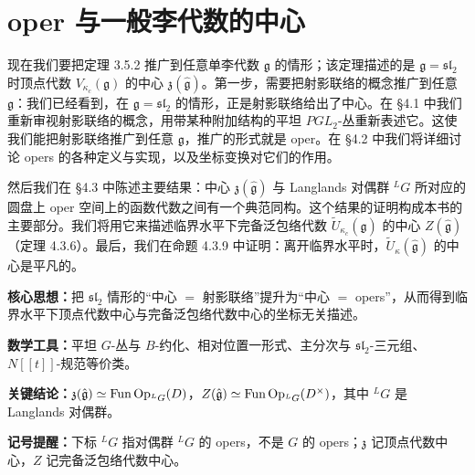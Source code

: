 
\chapter{oper 与一般李代数的中心}

现在我们要把定理 3.5.2 推广到任意单李代数 $\mathfrak{g}$ 的情形；该定理描述的是 $\mathfrak{g}=\mathfrak{sl}_2$ 时顶点代数 $V_{\kappa_c}(\mathfrak{g})$ 的中心 $\mathfrak{z}(\hat{\mathfrak{g}})$。第一步，需要把射影联络的概念推广到任意 $\mathfrak{g}$：我们已经看到，在 $\mathfrak{g}=\mathfrak{sl}_2$ 的情形，正是射影联络给出了中心。在 §4.1 中我们重新审视射影联络的概念，用带某种附加结构的平坦 $PGL_2$-丛重新表述它。这使我们能把射影联络推广到任意 $\mathfrak{g}$，推广的形式就是 oper。在 §4.2 中我们将详细讨论 opers 的各种定义与实现，以及坐标变换对它们的作用。

然后我们在 §4.3 中陈述主要结果：中心 $\mathfrak{z}(\hat{\mathfrak{g}})$ 与 Langlands 对偶群 ${}^LG$ 所对应的圆盘上 oper 空间上的函数代数之间有一个典范同构。这个结果的证明构成本书的主要部分。我们将用它来描述临界水平下完备泛包络代数 $\widetilde{U}_{\kappa_c}(\hat{\mathfrak{g}})$ 的中心 $Z(\hat{\mathfrak{g}})$（定理 4.3.6）。最后，我们在命题 4.3.9 中证明：离开临界水平时，$\widetilde{U}_\kappa(\hat{\mathfrak{g}})$ 的中心是平凡的。


\begin{keypoints}
    \item \textbf{核心思想：}把 $\mathfrak{sl}_2$ 情形的“中心 $=$ 射影联络”提升为“中心 $=$ opers”，从而得到临界水平下顶点代数中心与完备泛包络代数中心的坐标无关描述。
    \item \textbf{数学工具：}平坦 $G$-丛与 $B$-约化、相对位置一形式、主分次与 $\mathfrak{sl}_2$-三元组、$N[[t]]$-规范等价类。
    \item \textbf{关键结论：}$\mathfrak{z}(\hat{\mathfrak{g}})\simeq\operatorname{Fun}\operatorname{Op}_{{}^LG}(D)$，$Z(\hat{\mathfrak{g}})\simeq\operatorname{Fun}\operatorname{Op}_{{}^LG}(D^\times)$，其中 ${}^LG$ 是 Langlands 对偶群。
    \item \textbf{记号提醒：}下标 ${}^LG$ 指对偶群 ${}^LG$ 的 opers，不是 $G$ 的 opers；$\mathfrak{z}$ 记顶点代数中心，$Z$ 记完备泛包络代数中心。
\end{keypoints}

